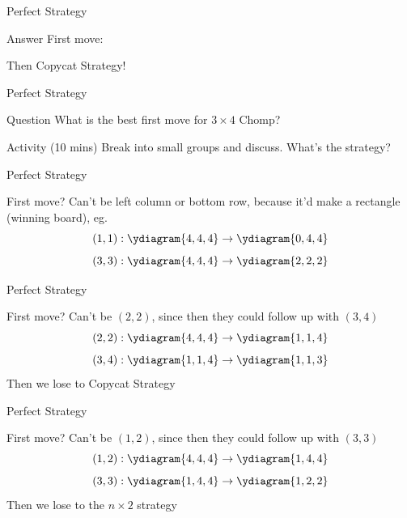 \documentclass{beamer}
\begin{document}
\begin{frame}{Perfect Strategy}
\pause
  \begin{block}{Answer}
    First move:
    \begin{center}
    \end{center}
\pause
    Then Copycat Strategy!
  \end{block}
\end{frame}

\begin{frame}{Perfect Strategy}
  \begin{block}{Question}
    What is the best first move for $3\times 4$ Chomp?
    \begin{center}
    \end{center}
  \end{block}
\pause
  \begin{block}{Activity (10 mins)}
    Break into small groups and discuss.  What's the strategy?
  \end{block}
\end{frame}

\begin{frame}{Perfect Strategy}
  \begin{block}{First move?}
      Can't be left column or bottom row, because it'd make a rectangle (winning board), eg.
      $$(1,1): \ydiagram{4,4,4}\rightarrow \ydiagram{0,4,4}$$
      $$(3,3): \ydiagram{4,4,4}\rightarrow \ydiagram{2,2,2}$$
  \end{block}
\end{frame}

\begin{frame}{Perfect Strategy}
  \begin{block}{First move?}
      Can't be $(2,2)$, since then they could follow up with $(3,4)$
      $$(2,2): \ydiagram{4,4,4}\rightarrow \ydiagram{1,1,4}$$
      $$(3,4): \ydiagram{1,1,4}\rightarrow \ydiagram{1,1,3}$$
      Then we lose to Copycat Strategy
  \end{block}
\end{frame}

\begin{frame}{Perfect Strategy}
  \begin{block}{First move?}
      Can't be $(1,2)$, since then they could follow up with $(3,3)$
      $$(1,2): \ydiagram{4,4,4}\rightarrow \ydiagram{1,4,4}$$
      $$(3,3): \ydiagram{1,4,4}\rightarrow \ydiagram{1,2,2}$$
      Then we lose to the $n\times 2$ strategy
  \end{block}
\end{frame}
\end{document}
